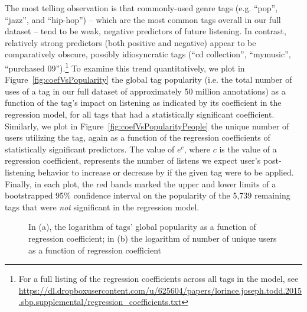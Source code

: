 The most telling observation is that commonly-used genre tags (e.g. ``pop'', ``jazz'', and ``hip-hop'') -- which are the most common tags overall in our full dataset -- tend to be weak, negative predictors of future listening. In contrast, relatively strong predictors (both positive and negative) appear to be comparatively obscure, possibly idiosyncratic tags (``cd collection'', ``mymusic'', ``purchased 09'').\footnote{For a full listing of the regression coefficients across all tags in the model, see \url{https://dl.dropboxusercontent.com/u/625604/papers/lorince.joseph.todd.2015.sbp.supplemental/regression_coefficients.txt}} To examine this trend quantitatively, we plot in Figure~\ref{fig:coefVsPopularity} the global tag popularity (i.e. the total number of uses of a tag in our full dataset of approximately 50 million annotations) as a function of the tag's impact on listening as indicated by its coefficient in the regression model, for all tags that had a statistically significant coefficient. Similarly, we plot in Figure~\ref{fig:coefVsPopularityPeople} the unique number of users utilizing the tag, again as a function of the regression coefficients of statistically significant predictors. The value of $e^c$, where $c$ is the value of a regression coefficient, represents the number of listens we expect user's post-listening behavior to increase or decrease by if the given tag were to be applied.  Finally, in each plot, the red bands marked the upper and lower limits of a bootstrapped 95\% confidence interval on the popularity of the 5,739 remaining tags that were \emph{not} significant in the regression model. 

  \begin{figure}[t]
    \hfill
    \caption{In (a), the logarithm of tags' global popularity as a function of regression coefficient; in (b) the logarithm of number of unique users as a function of regression coefficient}
    \label{fig:secondPlotSet}
    \vspace{-1em}
  \end{figure}

